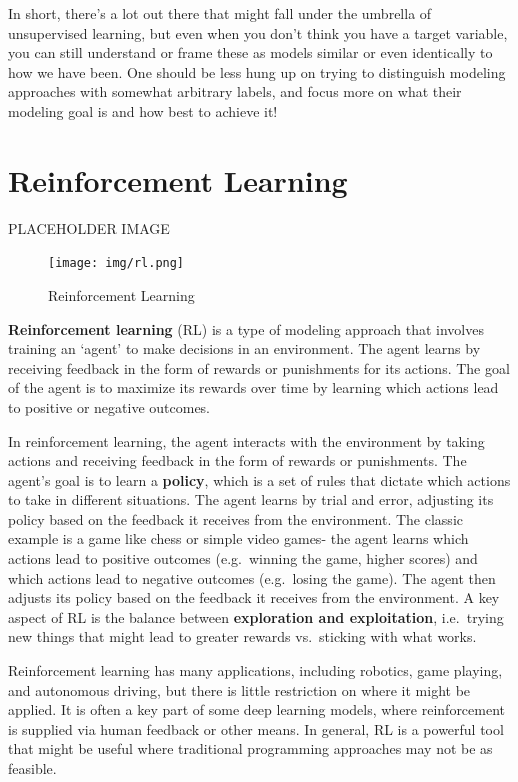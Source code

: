 \documentclass[
  letterpaper,
]{krantz}
\begin{document}
In short, there's a lot out there that might fall under the umbrella of
unsupervised learning, but even when you don't think you have a target
variable, you can still understand or frame these as models similar or
even identically to how we have been. One should be less hung up on
trying to distinguish modeling approaches with somewhat arbitrary
labels, and focus more on what their modeling goal is and how best to
achieve it!

\section{Reinforcement Learning}\label{sec-ml-more-reinforcement}

PLACEHOLDER IMAGE

\begin{figure}[H]

{\centering \texttt{[image: img/rl.png]}

}

\caption{Reinforcement Learning}

\end{figure}%

\textbf{Reinforcement learning} (RL) is a type of modeling approach that
involves training an `agent' to make decisions in an environment. The
agent learns by receiving feedback in the form of rewards or punishments
for its actions. The goal of the agent is to maximize its rewards over
time by learning which actions lead to positive or negative outcomes.

In reinforcement learning, the agent interacts with the environment by
taking actions and receiving feedback in the form of rewards or
punishments. The agent's goal is to learn a \textbf{policy}, which is a
set of rules that dictate which actions to take in different situations.
The agent learns by trial and error, adjusting its policy based on the
feedback it receives from the environment. The classic example is a game
like chess or simple video games- the agent learns which actions lead to
positive outcomes (e.g.~winning the game, higher scores) and which
actions lead to negative outcomes (e.g.~losing the game). The agent then
adjusts its policy based on the feedback it receives from the
environment. A key aspect of RL is the balance between
\textbf{exploration and exploitation}, i.e.~trying new things that might
lead to greater rewards vs.~sticking with what works.

Reinforcement learning has many applications, including robotics, game
playing, and autonomous driving, but there is little restriction on
where it might be applied. It is often a key part of some deep learning
models, where reinforcement is supplied via human feedback or other
means. In general, RL is a powerful tool that might be useful where
traditional programming approaches may not be as feasible.
\end{document}

